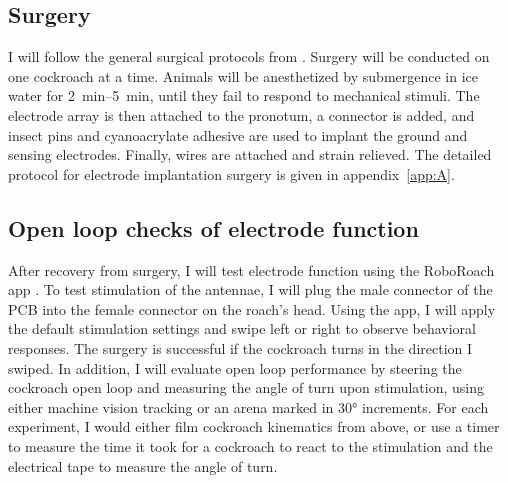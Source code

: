 \subsection{Surgery}
I will follow the general surgical protocols from \citep{backyardbrains2020roboroach}. Surgery will be conducted on one cockroach at a time. Animals will be anesthetized by submergence in ice water for \SIrange{2}{5}{\minute}, until they fail to respond to mechanical stimuli. The electrode array is then attached to the pronotum, a connector is added, and insect pins and cyanoacrylate adhesive are used to implant the ground and sensing electrodes. Finally, wires are attached and strain relieved. The detailed protocol for electrode implantation surgery is given in appendix~\ref{app:A}. 








\subsection{Open loop checks of electrode function}
After recovery from surgery, I will test electrode function using the RoboRoach app \citep{backyardbrains2020roboroach}. To test stimulation of the antennae, I will plug the male connector of the PCB into the female connector on the roach's head. Using the app, I will apply the default stimulation settings and swipe left or right to observe behavioral responses. The surgery is successful if the cockroach turns in the direction I swiped. In addition, I will evaluate open loop performance by steering the cockroach open loop and measuring the angle of turn upon stimulation, using either machine vision tracking or an arena marked in \ang{30} increments. For each experiment, I would either film cockroach kinematics from above, or use a timer to measure the time it took for a cockroach to react to the stimulation and the electrical tape to measure the angle of turn. 







